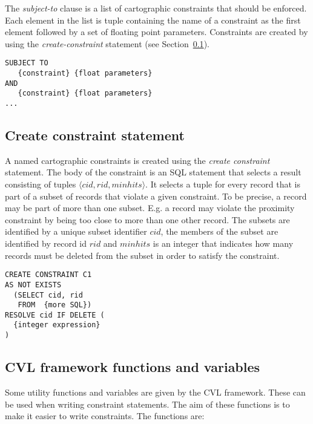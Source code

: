 The \emph{subject-to} clause is a list of cartographic constraints that should be enforced. Each element in the list is tuple containing the name of a constraint as the first element followed by a set of floating point parameters. Constraints are created by using the \emph{create-constraint} statement (see Section~\ref{sec:create-constraint-statement}).

\begin{lstlisting}
SUBJECT TO 
   {constraint} {float parameters} 
AND
   {constraint} {float parameters}
...
\end{lstlisting}

\subsection{Create constraint statement}
\label{sec:create-constraint-statement}

A named cartographic constraints is created using the \emph{create constraint} statement. The body of the constraint is an SQL statement that selects a result consisting of tuples $\langle cid, rid, minhits \rangle$. It selects a tuple for every record that is part of a subset of records that violate a given constraint. To be precise, a record may be part of more than one subset. E.g. a record may violate the proximity constraint by being too close to more than one other record. The subsets are identified by a unique subset identifier $cid$,  the members of the subset are identified by record id $rid$ and $minhits$ is an integer that indicates how many records must be deleted from the subset in order to satisfy the constraint.

\begin{lstlisting}
CREATE CONSTRAINT C1
AS NOT EXISTS
  (SELECT cid, rid
   FROM  {more SQL})
RESOLVE cid IF DELETE (
  {integer expression}
)

\end{lstlisting}

\subsection{CVL framework functions and variables}


Some utility functions and variables are given by the CVL framework. These can be used when writing constraint statements. The aim of these functions is to make it easier to write constraints. The functions are:

